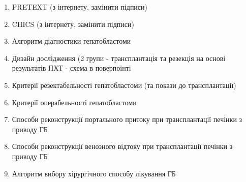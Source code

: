 \begin{enumerate}
    \item PRETEXT (з інтернету, замінити підписи) 
    \item CHICS (з інтернету, замінити підписи) 
    \item Алгоритм діагностики гепатобластоми
    \item Дизайн дослідження (2 групи - трансплантація та резекція на основі результатів ПХТ - схема в поверпоінті
    \item Критерії резектабельності гепатобластоми (та покази до трансплантації)
    \item Критерії операбельності гепатобластоми 
    \item Способи реконструкції портального притоку при трансплантації печінки з приводу ГБ
    \item Способи реконструкції венозного відтоку при трансплантації печінки з приводу ГБ
    \item Алгоритм вибору хірургічного способу лікування ГБ
    
    
\end{enumerate}
